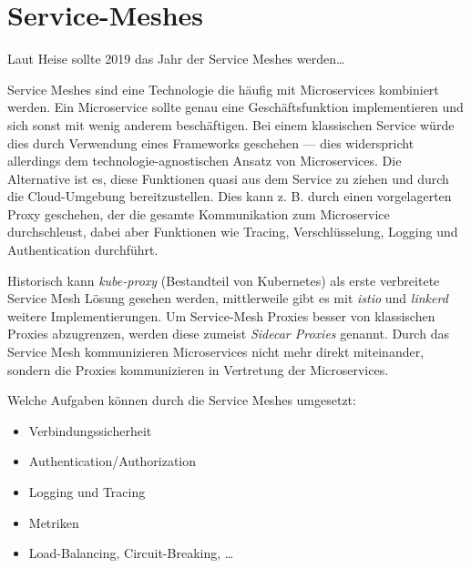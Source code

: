 \section{Service-Meshes}

Laut Heise sollte 2019 das Jahr der Service Meshes werden\ldots

Service Meshes sind eine Technologie die häufig mit Microservices kombiniert werden. Ein Microservice sollte genau eine Geschäftsfunktion implementieren und sich sonst mit wenig anderem beschäftigen. Bei einem klassischen Service würde dies durch Verwendung eines Frameworks geschehen --- dies widerspricht allerdings dem technologie-agnostischen Ansatz von Microservices. Die Alternative ist es, diese Funktionen quasi aus dem Service zu ziehen und durch die Cloud-Umgebung bereitzustellen. Dies kann z. B. durch einen vorgelagerten Proxy geschehen, der die gesamte Kommunikation zum Microservice durchschleust, dabei aber Funktionen wie Tracing, Verschlüsselung, Logging und Authentication durchführt.

Historisch kann \textit{kube-proxy} (Bestandteil von Kubernetes) als erste verbreitete Service Mesh Lösung gesehen werden, mittlerweile gibt es mit \textit{istio} und \textit{linkerd} weitere Implementierungen. Um Service-Mesh Proxies besser von klassischen Proxies abzugrenzen, werden diese zumeist \textit{Sidecar Proxies} genannt. Durch das Service Mesh kommunizieren Microservices nicht mehr direkt miteinander, sondern die Proxies kommunizieren in Vertretung der Microservices.

Welche Aufgaben können durch die Service Meshes umgesetzt:

\begin{itemize}
	\item Verbindungssicherheit
	\item Authentication/Authorization
	\item Logging und Tracing
	\item Metriken
	\item Load-Balancing, Circuit-Breaking, \ldots
\end{itemize}
